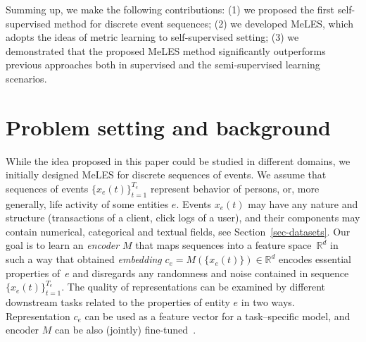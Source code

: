 \documentclass{article}
\newcommand{\R}{\mathbb{R}}
\begin{document}
Summing up, we make the following contributions: (1) we proposed the first self-supervised method for discrete event sequences; (2) we developed MeLES, which adopts the ideas of metric learning to self-supervised setting; (3) we demonstrated that the proposed MeLES method significantly outperforms previous approaches both in supervised and the semi-supervised learning scenarios. %

\section{Problem setting and background}\label{sec:problem setting}

While the idea proposed in this paper could be studied in different domains, we initially designed MeLES for discrete sequences of events. We assume that sequences of events $\{x_e(t)\}^{T_e}_{t=1}$ represent behavior of persons, or, more generally, life activity of some entities $e$. Events $x_e(t)$ may have any nature and structure (transactions of a client, click logs of a user), and their components may contain numerical, categorical and textual fields, see Section~\ref{sec-datasets}. Our goal is to learn an \textit{encoder} $M$ that maps sequences into a feature space~$\R^d$ in such a way that obtained \textit{embedding} $c_e=M(\{x_e(t) \})\in \R^d$ encodes essential properties of~$e$ and disregards any randomness and noise contained in sequence $\{x_e(t)\}^{T_e}_{t=1}$. The quality of representations can be examined by different downstream tasks related to the properties of entity $e$ in two ways. Representation $c_e$ can be used as a feature vector for a task--specific model, and encoder $M$ can be also (jointly) fine-tuned~\cite{Yosinski2014HowTA}.


\end{document}
